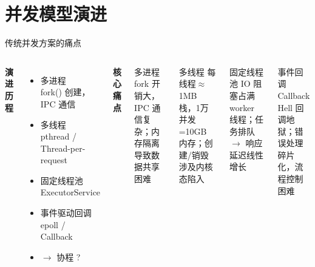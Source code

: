 \section{并发模型演进}

\begin{frame}{传统并发方案的痛点}
  \begin{columns}[T]
    \textbf{演进历程}
    \vspace{0.3em}
    \begin{itemize}
      \item 多进程 \\ {\footnotesize\color{corGray}fork() 创建，IPC 通信}
      \item 多线程 \\ {\footnotesize\color{corGray}pthread / Thread-per-request}
      \item 固定线程池 \\ {\footnotesize\color{corGray}ExecutorService}
      \item 事件驱动回调 \\ {\footnotesize\color{corGray}epoll / Callback}
      \item \textcolor{corGold}{$\rightarrow$ 协程 ?}
    \end{itemize}

    \textbf{核心痛点}
    \vspace{0.3em}

    \begin{alertblock}{多进程}
       fork 开销大，IPC 通信复杂；内存隔离导致数据共享困难
    \end{alertblock}

    \begin{alertblock}{多线程}
       每线程$\approx$1MB 栈，1万并发=10GB 内存；创建/销毁涉及内核态陷入
    \end{alertblock}

    \begin{alertblock}{固定线程池}
       IO 阻塞占满 worker 线程；任务排队 $\rightarrow$ 响应延迟线性增长
    \end{alertblock}

    \begin{alertblock}{事件回调}
       Callback Hell 回调地狱；错误处理碎片化，流程控制困难
    \end{alertblock}
  \end{columns}
\end{frame}

